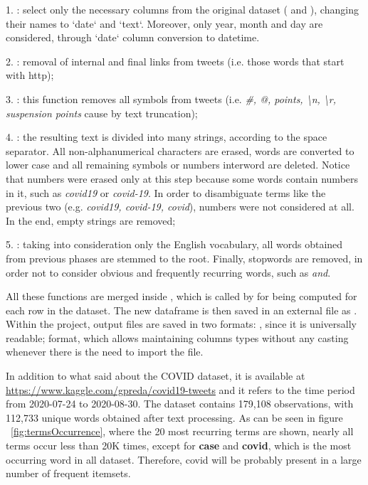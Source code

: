 1. : select only the necessary columns from the original dataset ( and ), changing their names to `date` and `text`. Moreover, only year, month and day are considered, through `date` column conversion to datetime. 

2. : removal of internal and final links from tweets (i.e. those words that start with http); 

3. : this function removes all symbols from tweets (i.e. \textit{\#, @, points, \textbackslash n, \textbackslash r, suspension points} cause by text truncation); 

4. : the resulting text is divided into many strings, according to the space separator. All non-alphanumerical characters are erased, words are converted to lower case and all remaining symbols or numbers interword are deleted. Notice that numbers were erased only at this step because some words contain numbers in it, such as \textit{covid19} or \textit{covid-19}. In order to disambiguate terms like the previous two (e.g. \textit{covid19, covid-19, covid}), numbers were not considered at all. In the end, empty strings are removed; 

5. : taking into consideration only the English vocabulary, all words obtained from previous phases are stemmed to the root. Finally, stopwords are removed, in order not to consider obvious and frequently recurring words, such as \textit{and}.

All these functions are merged inside , which is called by  for being computed for each row in the dataset. The new dataframe is then saved in an external file as . Within the project, output files are saved in two formats: , since it is universally readable;  format, which allows maintaining columns types without any casting whenever there is the need to import the file. 

In addition to what said about the COVID dataset, it is available at \url{https://www.kaggle.com/gpreda/covid19-tweets} and it refers to the time period from 2020-07-24 to 2020-08-30. The dataset contains 179,108 observations, with 112,733 unique words obtained after text processing. As can be seen in figure ~\ref{fig:termsOccurrence}, where the 20 most recurring terms are shown, nearly all terms occur less than 20K times, except for \textbf{case} and \textbf{covid}, which is the most occurring word in all dataset. Therefore, covid will be probably present in a large number of frequent itemsets.

